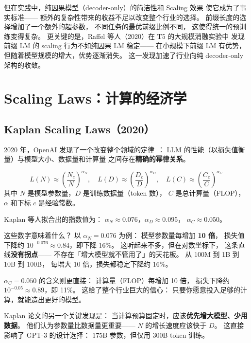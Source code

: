 但在实践中，纯因果模型（decoder-only）的简洁性和 Scaling 效果
使它成为了事实标准——
额外的复杂性带来的收益不足以改变整个行业的选择。
前缀长度的选择增加了一个额外的超参数，
不同任务的最优前缀比例不同，
这使得统一的预训练变得复杂。
更关键的是，Raffel 等人（2020）在 T5 的大规模消融实验中
发现前缀 LM 的 scaling 行为不如纯因果 LM 稳定——
在小规模下前缀 LM 有优势，
但随着模型规模的增大，优势逐渐消失。
这一发现加速了行业向纯 decoder-only 架构的收敛。

\section{Scaling Laws：计算的经济学}
\label{sec:pretrain-scaling-laws}

\subsection{Kaplan Scaling Laws（2020）}

2020 年，OpenAI 发现了一个改变整个领域的定律~\cite{kaplan2020scaling}：
LLM 的性能（以损失值衡量）与模型大小、数据量和计算量
之间存在\textbf{精确的幂律关系}。

\begin{equation}
  L(N) \approx \left(\frac{N_c}{N}\right)^{\alpha_N}, \quad
  L(D) \approx \left(\frac{D_c}{D}\right)^{\alpha_D}, \quad
  L(C) \approx \left(\frac{C_c}{C}\right)^{\alpha_C}
  \label{eq:scaling}
\end{equation}
其中 $N$ 是模型参数量，$D$ 是训练数据量（token 数），
$C$ 是总计算量（FLOP），
$\alpha$ 和下标 $c$ 是经验常数。

Kaplan 等人拟合出的指数值为：
$\alpha_N \approx 0.076$，$\alpha_D \approx 0.095$，
$\alpha_C \approx 0.050$。

这些数字意味着什么？
以 $\alpha_N = 0.076$ 为例：
模型参数量每增加 \textbf{10 倍}，
损失值下降约 $10^{-0.076} \approx 0.84$，即下降 16\%。
这听起来不多，但在对数坐标下，
这条直线\textbf{没有拐点}——
不存在「增大模型就不管用了」的天花板。
从 100M 到 1B 到 10B 到 100B，
每增大 10 倍，损失都稳定下降约 16\%。

$\alpha_C = 0.050$ 的含义则更直接：
计算量（FLOP）每增加 10 倍，
损失下降约 $10^{-0.05} \approx 0.89$，即 11\%。
这给了整个行业巨大的信心：
只要你愿意投入足够的计算，就能造出更好的模型。

Kaplan 论文的另一个关键发现是：
当计算预算固定时，应该\textbf{优先增大模型、少用数据}。
他们认为参数量比数据量更重要——
$N$ 的增长速度应该快于 $D$。
这直接影响了 GPT-3 的设计选择：
175B 参数，但仅用 300B token 训练。

